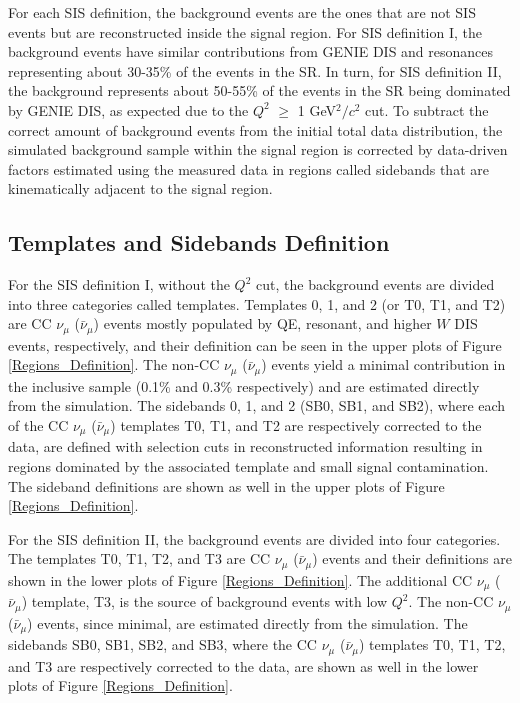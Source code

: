 \documentclass[aps, prd, twocolumn, showpacs, superscriptaddress, floatfix]{revtex4-2}
\begin{document}
For each SIS definition, the background events are the ones that are not SIS events but are reconstructed inside the signal region. For SIS definition I, the background events have similar contributions from GENIE DIS and resonances representing about 30-35\% of the events in the SR. In turn, for SIS definition II, the background represents about 50-55\% of the events in the SR being dominated by GENIE DIS, as expected due to the $Q^2$ $\geq$ 1 GeV$^2/c^2$ cut. To subtract the correct amount of background events from the initial total data distribution, the simulated background sample within the signal region is corrected by data-driven factors estimated using the measured data in regions called sidebands that are kinematically adjacent to the signal region.

\subsection{Templates and Sidebands Definition}
For the SIS definition I, without the $Q^2$ cut, the background events are divided into three categories called templates. Templates 0, 1, and 2 (or T0, T1, and T2) are CC $\nu_\mu$ ($\bar{\nu}_\mu$) events mostly populated by QE, resonant, and higher $W$ DIS events, respectively, and their definition can be seen in the upper plots of Figure \ref{Regions_Definition}. The non-CC $\nu_\mu$ ($\bar{\nu}_\mu$) events yield a minimal contribution in the inclusive sample (0.1\% and 0.3\% respectively) and are estimated directly from the simulation. The sidebands 0, 1, and 2 (SB0, SB1, and SB2), where each of the CC $\nu_\mu$ ($\bar{\nu}_\mu$) templates T0, T1, and T2 are respectively corrected to the data, are defined with selection cuts in reconstructed information resulting in regions dominated by the associated template and small signal contamination. The sideband definitions are shown as well in the upper plots of Figure \ref{Regions_Definition}. 

For the SIS definition II, the background events are divided into four categories. The templates T0, T1, T2, and T3 are CC $\nu_\mu$ ($\bar{\nu}_\mu$) events and their definitions are shown in the lower plots of Figure \ref{Regions_Definition}. The additional CC $\nu_\mu$ ($\bar{\nu}_\mu$) template, T3, is the source of background events with low $Q^2$. The non-CC $\nu_\mu$ ($\bar{\nu}_\mu$) events, since minimal, are estimated directly from the simulation. The sidebands SB0, SB1, SB2, and SB3, where the CC $\nu_\mu$ ($\bar{\nu}_\mu$) templates T0, T1, T2, and T3 are respectively corrected to the data, are shown as well in the lower plots of Figure \ref{Regions_Definition}.
\end{document}
